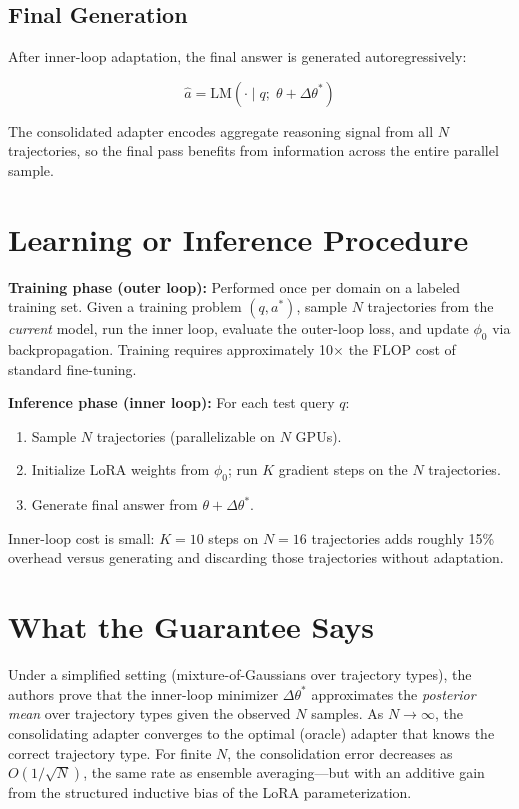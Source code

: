\documentclass[10pt,twocolumn]{article}
\begin{document}
\subsection*{Final Generation}

After inner-loop adaptation, the final answer is generated autoregressively:

\begin{equation}
\hat{a} = \mathrm{LM}(\cdot \mid q;\;\theta + \Delta\theta^*)
\end{equation}

The consolidated adapter encodes aggregate reasoning signal from all $N$ trajectories, so the final pass benefits from information across the entire parallel sample.

\section{Learning or Inference Procedure}

\textbf{Training phase (outer loop):} Performed once per domain on a labeled training set.
Given a training problem $(q, a^*)$, sample $N$ trajectories from the \emph{current} model, run the inner loop, evaluate the outer-loop loss, and update $\phi_0$ via backpropagation.
Training requires approximately 10$\times$ the FLOP cost of standard fine-tuning.

\textbf{Inference phase (inner loop):} For each test query $q$:
\begin{enumerate}[leftmargin=1.5em,itemsep=1pt]
  \item Sample $N$ trajectories (parallelizable on $N$ GPUs).
  \item Initialize LoRA weights from $\phi_0$; run $K$ gradient steps on the $N$ trajectories.
  \item Generate final answer from $\theta + \Delta\theta^*$.
\end{enumerate}
Inner-loop cost is small: $K=10$ steps on $N=16$ trajectories adds roughly 15\% overhead versus generating and discarding those trajectories without adaptation.

\section{What the Guarantee Says}

Under a simplified setting (mixture-of-Gaussians over trajectory types), the authors prove that the inner-loop minimizer $\Delta\theta^*$ approximates the \emph{posterior mean} over trajectory types given the observed $N$ samples.
As $N \to \infty$, the consolidating adapter converges to the optimal (oracle) adapter that knows the correct trajectory type.
For finite $N$, the consolidation error decreases as $O(1/\sqrt{N})$, the same rate as ensemble averaging---but with an additive gain from the structured inductive bias of the LoRA parameterization.
\end{document}
